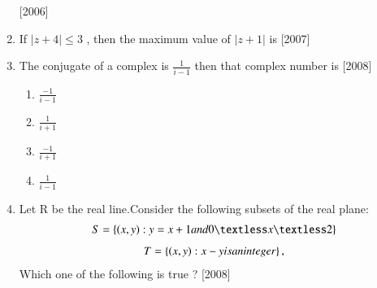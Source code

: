 \documentclass[journal,12pt,twocolumn,article]{IEEEtran}
\theoremstyle{remark}
\begin{document}
\begin{enumerate}[start = 14]
\hfill{[2006]}
\begin{enumerate}
\end{enumerate}
\item If $|z+4|\leq 3$ , then the maximum value of $|z+1|$ is
\hfill{[2007]}                                     
\begin{enumerate}                                  
\end{enumerate}
\item The conjugate of a complex is $\frac{1}{i-1}$ then that complex number is
\hfill{[2008]}
\begin{multicols}{4}
\begin{enumerate}
\item $\frac{-1}{i-1}$
\item $\frac{1}{i+1}$
\item $\frac{-1}{i+1}$
\item $\frac{1}{i-1}$
\end{enumerate}
\end{multicols}
\item Let R be the real line.Consider the following subsets of the real plane: 
\begin{align}
S=\cbrak{(x,y):y=x+1 and 0{\textless}x{\textless}2}
\end{align}
\begin{align}
T=\left\{(x,y):x-y is an integer\right\}, 
\end{align}
Which one of the following is true ?
\hfill{[2008]}
\begin{enumerate}
                                


\end{enumerate}
\end{enumerate}
\end{document}
